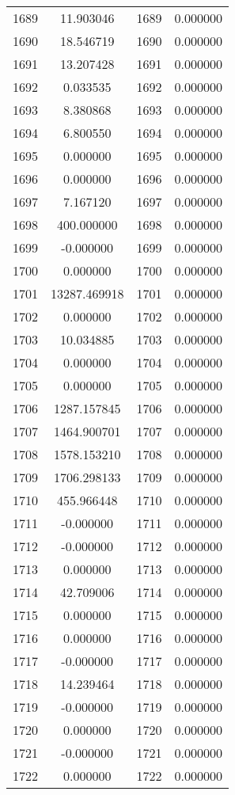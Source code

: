 \documentclass[12pt]{article}
\begin{document}
\begin{longtable}{@{}cccc@{}}
1689 & 11.903046 & 1689 & 0.000000 \\
1690 & 18.546719 & 1690 & 0.000000 \\
1691 & 13.207428 & 1691 & 0.000000 \\
1692 & 0.033535 & 1692 & 0.000000 \\
1693 & 8.380868 & 1693 & 0.000000 \\
1694 & 6.800550 & 1694 & 0.000000 \\
1695 & 0.000000 & 1695 & 0.000000 \\
1696 & 0.000000 & 1696 & 0.000000 \\
1697 & 7.167120 & 1697 & 0.000000 \\
1698 & 400.000000 & 1698 & 0.000000 \\
1699 & -0.000000 & 1699 & 0.000000 \\
1700 & 0.000000 & 1700 & 0.000000 \\
1701 & 13287.469918 & 1701 & 0.000000 \\
1702 & 0.000000 & 1702 & 0.000000 \\
1703 & 10.034885 & 1703 & 0.000000 \\
1704 & 0.000000 & 1704 & 0.000000 \\
1705 & 0.000000 & 1705 & 0.000000 \\
1706 & 1287.157845 & 1706 & 0.000000 \\
1707 & 1464.900701 & 1707 & 0.000000 \\
1708 & 1578.153210 & 1708 & 0.000000 \\
1709 & 1706.298133 & 1709 & 0.000000 \\
1710 & 455.966448 & 1710 & 0.000000 \\
1711 & -0.000000 & 1711 & 0.000000 \\
1712 & -0.000000 & 1712 & 0.000000 \\
1713 & 0.000000 & 1713 & 0.000000 \\
1714 & 42.709006 & 1714 & 0.000000 \\
1715 & 0.000000 & 1715 & 0.000000 \\
1716 & 0.000000 & 1716 & 0.000000 \\
1717 & -0.000000 & 1717 & 0.000000 \\
1718 & 14.239464 & 1718 & 0.000000 \\
1719 & -0.000000 & 1719 & 0.000000 \\
1720 & 0.000000 & 1720 & 0.000000 \\
1721 & -0.000000 & 1721 & 0.000000 \\
1722 & 0.000000 & 1722 & 0.000000 \\

\end{longtable}
\end{document}
